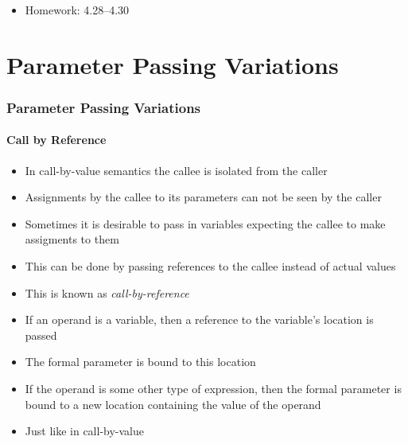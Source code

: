 \documentclass{beamer}
\begin{document}
\begin{frame}[fragile]
\begin{scriptsize}
\begin{itemize}
\item<1-> Homework: 4.28--4.30
\end{itemize}
\end{scriptsize}
\end{frame}



\section{Parameter Passing Variations}

\begin{frame}[fragile]
\frametitle{Parameter Passing Variations}
\framesubtitle{Call by Reference}
\begin{scriptsize}
\begin{itemize}
\item<1-> In call-by-value semantics the callee is isolated from the caller

\item<1-> Assignments by the callee to its parameters can not be seen by the caller

\item<2-> Sometimes it is desirable to pass in variables expecting the callee to make assigments to them

\item<2-> This can be done by passing references to the callee instead of actual values

\item<2-> This is known as \emph{call-by-reference}

\item<3-> If an operand is a variable, then a reference to the variable’s location is passed

\item<3-> The formal parameter is bound to this location

\item<4-> If the operand is some other type of expression, then the formal parameter is bound to a new location containing the value of the operand

\item<4-> Just like in call-by-value

\end{itemize}
\end{scriptsize}
\end{frame}
\end{document}
